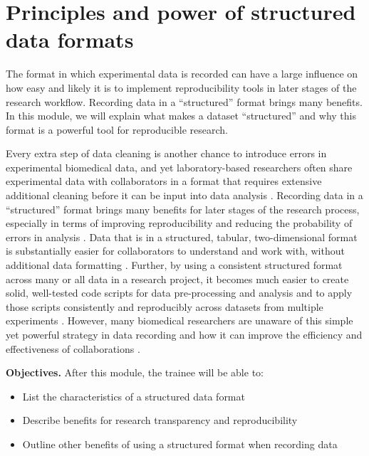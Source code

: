 \documentclass[]{tufte-book}
\providecommand{\tightlist}{%
  \setlength{\itemsep}{0pt}\setlength{\parskip}{0pt}}
\begin{document}
\hypertarget{module2}{%
\section{Principles and power of structured data formats}\label{module2}}

The format in which experimental data is recorded can have a large influence on
how easy and likely it is to implement reproducibility tools in later stages of
the research workflow. Recording data in a ``structured'' format brings many
benefits. In this module, we will explain what makes a dataset ``structured'' and
why this format is a powerful tool for reproducible research.

Every extra step of data cleaning is another chance to introduce errors in
experimental biomedical data, and yet laboratory-based researchers often share
experimental data with collaborators in a format that requires extensive
additional cleaning before it can be input into data analysis
\citep{broman2018data}. Recording data in a ``structured'' format brings many
benefits for later stages of the research process, especially in terms of
improving reproducibility and reducing the probability of errors in analysis
\citep{ellis2018share}. Data that is in a structured, tabular, two-dimensional
format is substantially easier for collaborators to understand and work with,
without additional data formatting \citep{broman2018data}. Further, by using a
consistent structured format across many or all data in a research project, it
becomes much easier to create solid, well-tested code scripts for data
pre-processing and analysis and to apply those scripts consistently and
reproducibly across datasets from multiple experiments \citep{broman2018data}.
However, many biomedical researchers are unaware of this simple yet powerful
strategy in data recording and how it can improve the efficiency and
effectiveness of collaborations \citep{ellis2018share}.

\textbf{Objectives.} After this module, the trainee will be able to:

\begin{itemize}
\tightlist
\item
  List the characteristics of a structured data format
\item
  Describe benefits for research transparency and reproducibility
\item
  Outline other benefits of using a structured format when recording data
\end{itemize}
\end{document}
